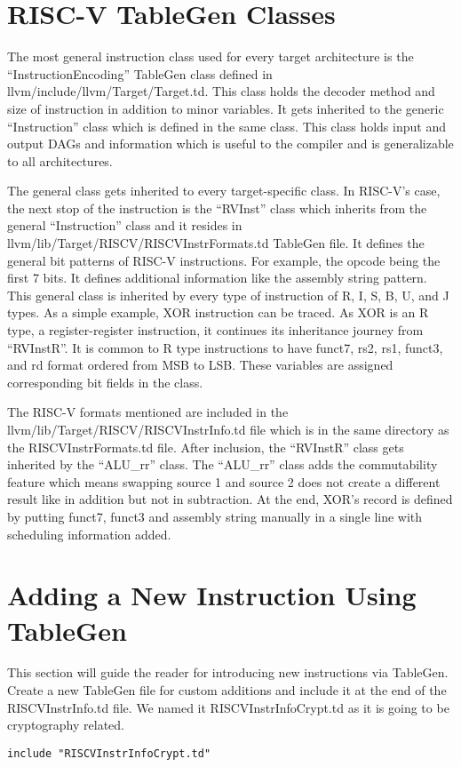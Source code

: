 \section{RISC-V TableGen Classes}
The most general instruction class used for every target architecture is the “InstructionEncoding” TableGen class defined in llvm/include/llvm/Target/Target.td. This class holds the decoder method and size of instruction in addition to minor variables. It gets inherited to the generic “Instruction” class which is defined in the same class. This class holds input and output DAGs and information which is useful to the compiler and is generalizable to all architectures.
\par

The general class gets inherited to every target-specific class. In RISC-V’s case, the next stop of the instruction is the “RVInst” class which inherits from the general “Instruction” class and it resides in llvm/lib/Target/RISCV/RISCVInstrFormats.td TableGen file. It defines the general bit patterns of RISC-V instructions. For example, the opcode being the first 7 bits. It defines additional information like the assembly string pattern. This general class is inherited by every type of instruction of R, I, S, B, U, and J types. As a simple example, XOR instruction can be traced. As XOR is an R type, a register-register instruction, it continues its inheritance journey from “RVInstR”. It is common to R type instructions to have funct7, rs2, rs1, funct3, and rd format ordered from MSB to LSB. These variables are assigned corresponding bit fields in the class. 
\par

The RISC-V formats mentioned are included in the llvm/lib/Target/RISCV/RISCVInstrInfo.td file which is in the same directory as the RISCVInstrFormats.td file. After inclusion, the “RVInstR” class gets inherited by the “ALU\_rr” class. The “ALU\_rr” class adds the commutability feature which means swapping source 1 and source 2 does not create a different result like in addition but not in subtraction. At the end, XOR’s record is defined by putting funct7, funct3 and assembly string manually in a single line with scheduling information added. 

\section{Adding a New Instruction Using TableGen}\label{sec:MLA_add_section}
This section will guide the reader for introducing new instructions via TableGen.
Create a new TableGen file for custom additions and include it at the end of the RISCVInstrInfo.td file. We named it RISCVInstrInfoCrypt.td as it is going to be cryptography related.
\begin{lstlisting}[caption= Include file]
include "RISCVInstrInfoCrypt.td"
\end{lstlisting}

